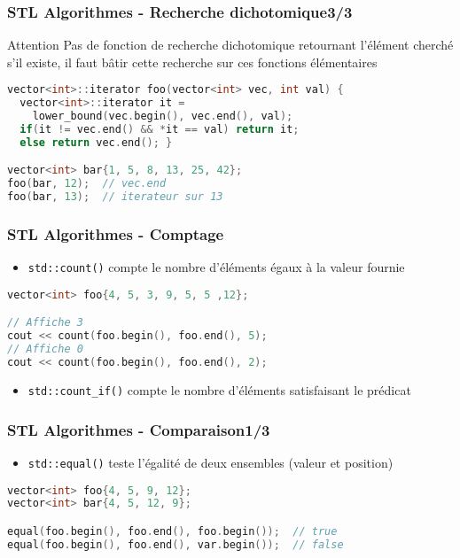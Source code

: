 \documentclass[C++.tex]{subfiles}
\begin{document}
\begin{frame}[fragile]
	\frametitle{STL Algorithmes - Recherche dichotomique\titlehfill{}3/3}
	\begin{alertblock}{Attention}
		Pas de fonction de recherche dichotomique retournant l'élément cherché s'il existe, il faut bâtir cette recherche sur ces fonctions élémentaires
	\end{alertblock}

	\begin{lstlisting}[language=C++]
vector<int>::iterator foo(vector<int> vec, int val) {
  vector<int>::iterator it = 
    lower_bound(vec.begin(), vec.end(), val);
  if(it != vec.end() && *it == val) return it;
  else return vec.end(); }

vector<int> bar{1, 5, 8, 13, 25, 42};
foo(bar, 12);  // vec.end
foo(bar, 13);  // iterateur sur 13
\end{lstlisting}
\end{frame}

\begin{frame}[fragile]
	\frametitle{STL Algorithmes - Comptage}
	\begin{itemize}
		\item \lstinline|std::count()| compte le nombre d'éléments égaux à la valeur fournie
	\end{itemize}

	\begin{lstlisting}[language=C++]
vector<int> foo{4, 5, 3, 9, 5, 5 ,12};

// Affiche 3
cout << count(foo.begin(), foo.end(), 5);
// Affiche 0
cout << count(foo.begin(), foo.end(), 2);\end{lstlisting}

	\begin{itemize}
		\item \lstinline|std::count_if()| compte le nombre d'éléments satisfaisant le prédicat
	\end{itemize}
\end{frame}

\begin{frame}[fragile]
	\frametitle{STL Algorithmes - Comparaison\titlehfill{}1/3}
	\begin{itemize}
		\item \lstinline|std::equal()| teste l'égalité de deux ensembles (valeur et position)
	\end{itemize}


	\begin{lstlisting}[language=C++]
vector<int> foo{4, 5, 9, 12};
vector<int> bar{4, 5, 12, 9};

equal(foo.begin(), foo.end(), foo.begin());  // true
equal(foo.begin(), foo.end(), var.begin());  // false\end{lstlisting}
\end{frame}
\end{document}
